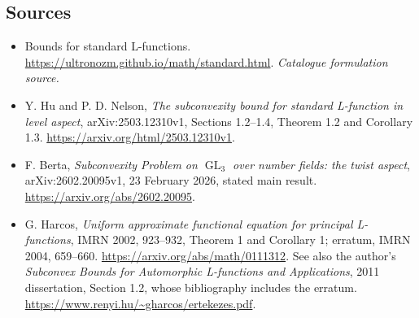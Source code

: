 \documentclass[11pt,a4paper]{article}
\numberwithin{equation}{section}
\begin{document}
\subsection{Sources}
\begin{itemize}\raggedright
\item[\textnormal{[S1]}]\hypertarget{source:statement:1}{} Bounds for standard L-functions.
\url{https://ultronozm.github.io/math/standard.html}.
{\small\textit{Catalogue formulation source.}}
\item[\textnormal{[E1]}]\hypertarget{extra:statement:1}{} Y. Hu and P. D. Nelson,
\emph{The subconvexity bound for standard L-function in level aspect},
arXiv:2503.12310v1, Sections 1.2--1.4, Theorem 1.2 and Corollary 1.3.
\url{https://arxiv.org/html/2503.12310v1}.
\item[\textnormal{[E2]}]\hypertarget{extra:statement:2}{} F. Berta,
\emph{Subconvexity Problem on $\operatorname{GL}_3$ over number fields:
the twist aspect}, arXiv:2602.20095v1, 23 February 2026, stated main result.
\url{https://arxiv.org/abs/2602.20095}.
\item[\textnormal{[E3]}]\hypertarget{extra:statement:3}{} G. Harcos,
\emph{Uniform approximate functional equation for principal L-functions},
IMRN 2002, 923--932, Theorem 1 and Corollary 1; erratum, IMRN 2004, 659--660.
\url{https://arxiv.org/abs/math/0111312}.
See also the author's \emph{Subconvex Bounds for Automorphic L-functions and
Applications}, 2011 dissertation, Section 1.2, whose bibliography includes
the erratum. \url{https://www.renyi.hu/~gharcos/ertekezes.pdf}.

\end{itemize}
\end{document}
